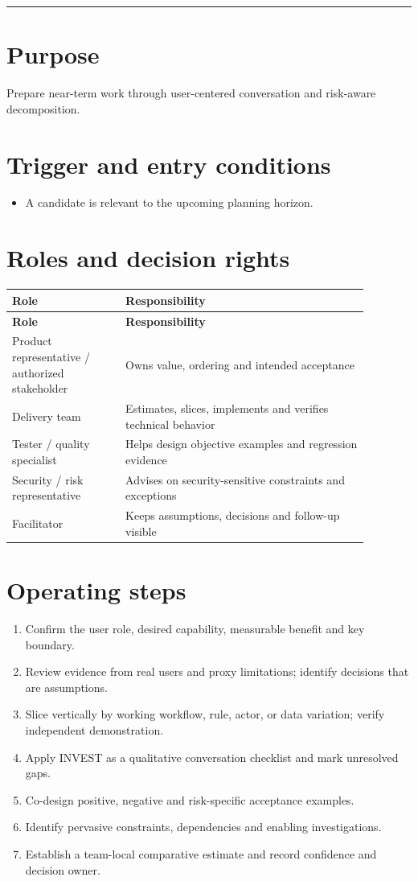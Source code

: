 \documentclass[11pt,letterpaper]{article}
\begin{document}
\tableofcontents\medskip\noindent\rule{\linewidth}{0.4pt}\medskip
\section{Purpose}
Prepare near-term work through user-centered conversation and risk-aware decomposition.

\section{Trigger and entry conditions}
\begin{itemize}[leftmargin=*,itemsep=2pt]
\item A candidate is relevant to the upcoming planning horizon.
\end{itemize}
\section{Roles and decision rights}
\begin{longtable}{|p{0.28\linewidth}|p{0.60\linewidth}|}\hline
\textbf{Role} & \textbf{Responsibility} \\ \hline\endfirsthead\hline
\textbf{Role} & \textbf{Responsibility} \\ \hline\endhead
Product representative / authorized stakeholder & Owns value, ordering and intended acceptance \\ \hline
Delivery team & Estimates, slices, implements and verifies technical behavior \\ \hline
Tester / quality specialist & Helps design objective examples and regression evidence \\ \hline
Security / risk representative & Advises on security-sensitive constraints and exceptions \\ \hline
Facilitator & Keeps assumptions, decisions and follow-up visible \\ \hline
\end{longtable}
\section{Operating steps}
\begin{enumerate}[leftmargin=*,itemsep=3pt]
\item Confirm the user role, desired capability, measurable benefit and key boundary.
\item Review evidence from real users and proxy limitations; identify decisions that are assumptions.
\item Slice vertically by working workflow, rule, actor, or data variation; verify independent demonstration.
\item Apply INVEST as a qualitative conversation checklist and mark unresolved gaps.
\item Co-design positive, negative and risk-specific acceptance examples.
\item Identify pervasive constraints, dependencies and enabling investigations.
\item Establish a team-local comparative estimate and record confidence and decision owner.
\end{enumerate}
\end{document}
